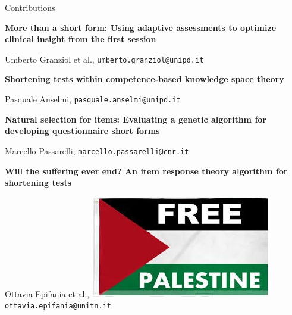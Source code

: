 \documentclass[compress]{beamer}
\begin{document}
\begin{frame}{Contributions}
	
	\small
	


	

\textbf{More than a short form: Using adaptive assessments to optimize clinical insight from the first session}
	
	
{\footnotesize{Umberto	Granziol et al., \texttt{umberto.granziol@unipd.it}}} 
	
	
	\textbf{Shortening tests within competence-based knowledge space theory}
	

{\footnotesize{Pasquale Anselmi, \texttt{pasquale.anselmi@unipd.it}}}


	\textbf{Natural selection for items: Evaluating a genetic algorithm for developing questionnaire short forms}



{\footnotesize{Marcello Passarelli, \texttt{marcello.passarelli@cnr.it}}}


\textbf{Will the suffering ever end? An item response theory algorithm for shortening tests}

{\footnotesize{Ottavia Epifania et al., \includegraphics[width=.04\linewidth]{img/freepalestine} \texttt{ottavia.epifania@unitn.it}}} 


	
\end{frame}
\end{document}
